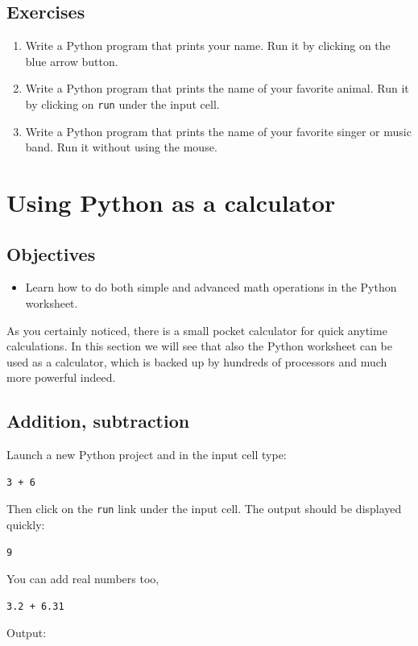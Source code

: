 \documentclass[article,A4,12pt]{llncs}
\begin{document}
\subsection{Exercises}

\begin{enumerate}
\item Write a Python program that prints your name. Run it by clicking on the blue arrow button.
\item Write a Python program that prints the name of your favorite animal. 
      Run it by clicking on {\tt run} under the input cell.
\item Write a Python program that prints the name of your favorite singer 
      or music band. Run it without using the mouse.
\end{enumerate}

\section{Using Python as a calculator}

\subsection{Objectives}

\begin{itemize}
\item Learn how to do both simple and advanced math operations in the Python worksheet.
\end{itemize}
As you certainly noticed, there is a small pocket calculator for quick anytime 
calculations. In this section we will see that also the Python worksheet can be 
used as a calculator, which is backed up by hundreds of processors and much more powerful indeed.

\subsection{Addition, subtraction}

Launch a new Python project and in the input cell type:

\begin{verbatim}
3 + 6
\end{verbatim}
Then click on the {\tt run} link under the input cell. The output should be displayed quickly:

\begin{verbatim}
9
\end{verbatim}
You can add real numbers too,
\begin{verbatim}
3.2 + 6.31
\end{verbatim}
Output:
\end{document}
